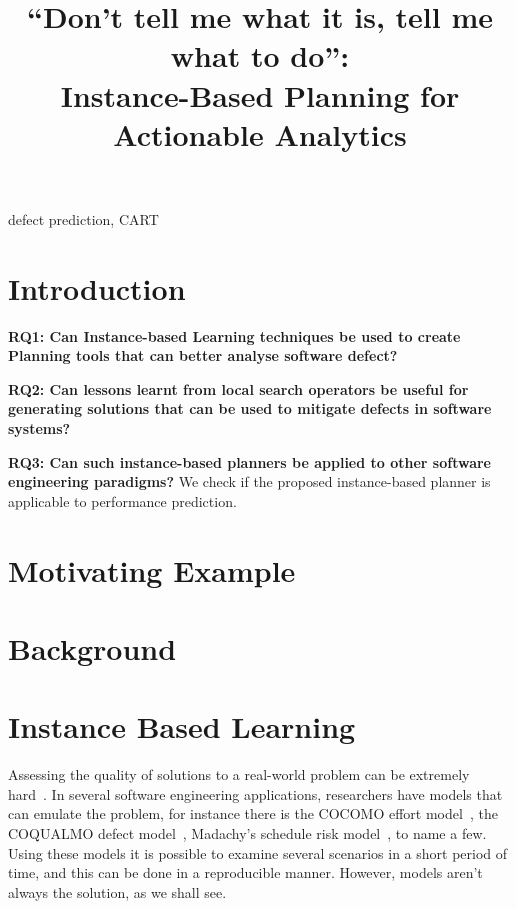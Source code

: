 \documentclass[conference]{IEEEtran}
\begin{document}
  \title{``Don't tell me what it is, tell me what to do'':\\Instance-Based Planning for Actionable Analytics}
  
  \maketitle
  
  
  \begin{abstract}
 
  \end{abstract}
  \begin{IEEEkeywords}
    defect prediction, CART
  \end{IEEEkeywords}
  
\section{Introduction}
{\bf RQ1: Can Instance-based Learning techniques be used to create Planning tools that can better analyse software defect?} 


{\bf RQ2: Can lessons learnt from local search operators be useful for generating solutions that can be used to mitigate defects in software systems?} 

{\bf RQ3: Can such instance-based planners be applied to other software engineering paradigms?}
We check if the proposed instance-based planner is applicable to performance prediction.

\section{Motivating Example}
\section{Background}
\section{Instance Based Learning}

Assessing the quality of solutions to a real-world problem can be extremely hard~\cite{menzies2005xomo}. In several software engineering applications, researchers have models that can emulate the problem, for instance there is the COCOMO effort model~\cite[p29-57]{boehm2009software}, the COQUALMO defect model~\cite[p254-268]{boehm2009software}, Madachy’s schedule risk model~\cite[p284-291]{boehm2009software}, to name a few. Using these models it is possible to examine several scenarios in a short period of time, and this can be done in a reproducible manner. However, models aren't always the solution, as we shall see. 
\end{document}
